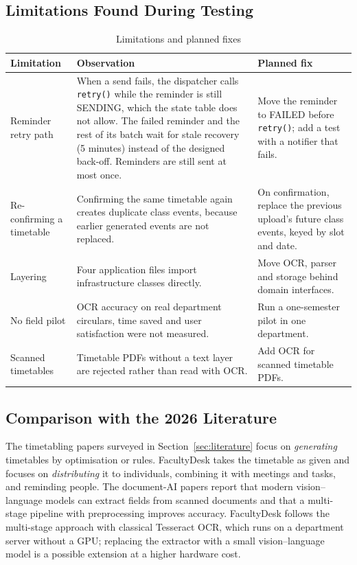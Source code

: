\subsection{Limitations Found During Testing}
\begin{xltabular}{\textwidth}{|p{3.4cm}|Y|Y|}
\caption{Limitations and planned fixes}\\
\hline
\textbf{Limitation} & \textbf{Observation} & \textbf{Planned fix} \\ \hline
Reminder retry path & When a send fails, the dispatcher calls \texttt{retry()} while the reminder is still SENDING, which the state table does not allow. The failed reminder and the rest of its batch wait for stale recovery (5 minutes) instead of the designed back-off. Reminders are still sent at most once. & Move the reminder to FAILED before \texttt{retry()}; add a test with a notifier that fails. \\ \hline
Re-confirming a timetable & Confirming the same timetable again creates duplicate class events, because earlier generated events are not replaced. & On confirmation, replace the previous upload's future class events, keyed by slot and date. \\ \hline
Layering & Four application files import infrastructure classes directly. & Move OCR, parser and storage behind domain interfaces. \\ \hline
No field pilot & OCR accuracy on real department circulars, time saved and user satisfaction were not measured. & Run a one-semester pilot in one department. \\ \hline
Scanned timetables & Timetable PDFs without a text layer are rejected rather than read with OCR. & Add OCR for scanned timetable PDFs. \\ \hline
\end{xltabular}

\subsection{Comparison with the 2026 Literature}
The timetabling papers surveyed in Section~\ref{sec:literature} focus on \emph{generating} timetables by optimisation or rules. FacultyDesk takes the timetable as given and focuses on \emph{distributing} it to individuals, combining it with meetings and tasks, and reminding people. The document-AI papers report that modern vision--language models can extract fields from scanned documents and that a multi-stage pipeline with preprocessing improves accuracy. FacultyDesk follows the multi-stage approach with classical Tesseract OCR, which runs on a department server without a GPU; replacing the extractor with a small vision--language model is a possible extension at a higher hardware cost.
